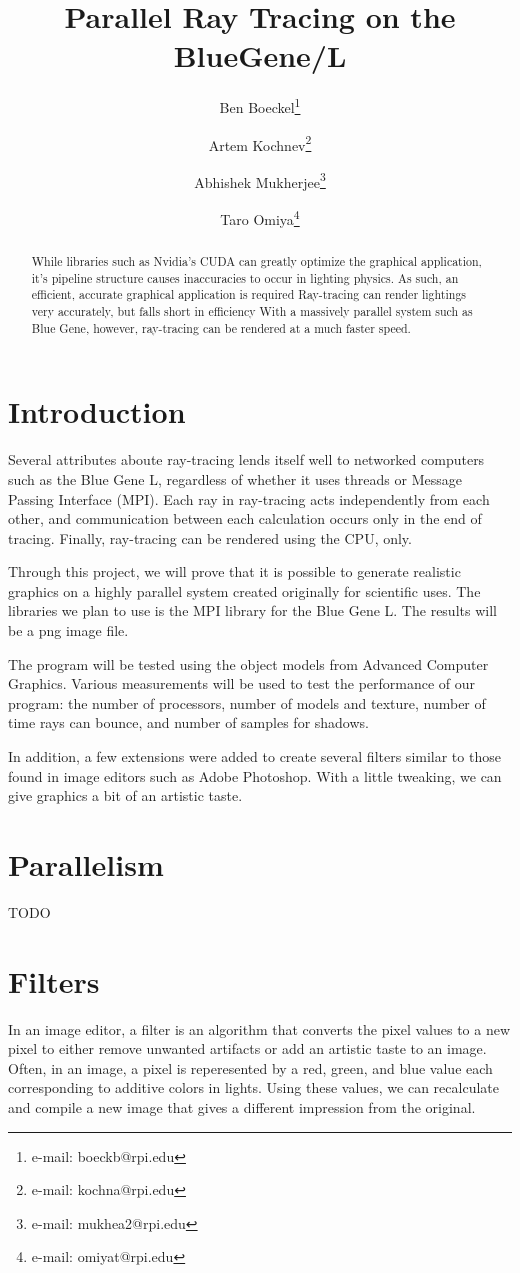 \documentclass{acmsiggraph}
\title{Parallel Ray Tracing on the BlueGene/L}
\author{%
Ben Boeckel\thanks{e-mail: boeckb@rpi.edu} %
\and Artem Kochnev\thanks{e-mail: kochna@rpi.edu} %
\and Abhishek Mukherjee\thanks{e-mail: mukhea2@rpi.edu} %
\and Taro Omiya\thanks{e-mail: omiyat@rpi.edu}}
\begin{document}
\maketitle

\begin{abstract}
While libraries such as Nvidia's CUDA can greatly optimize the graphical
application, it's pipeline structure causes inaccuracies to occur in lighting
physics.  As such, an efficient, accurate graphical application is required
Ray-tracing can render lightings very accurately, but falls short in efficiency
With a massively parallel system such as Blue Gene, however, ray-tracing can be
rendered at a much faster speed.
\end{abstract}
\keywordlist

\section{Introduction}
Several attributes aboute ray-tracing lends itself well to networked computers
such as the Blue Gene L, regardless of whether it uses threads or Message
Passing Interface (MPI).  Each ray in ray-tracing acts independently from each
other, and communication between each calculation occurs only in the end of
tracing.  Finally, ray-tracing can be rendered using the CPU, only.

Through this project, we will prove that it is possible to generate realistic
graphics on a highly parallel system created originally for scientific uses.
The libraries we plan to use is the MPI library for the Blue Gene L.
The results will be a png image file.

The program will be tested using the object models from Advanced Computer
Graphics.  Various measurements will be used to test the performance of our
program: the number of processors, number of models and texture, number of time
rays can bounce, and number of samples for shadows.

In addition, a few extensions were added to create several filters similar to
those found in image editors such as Adobe Photoshop. With a little tweaking, we
can give graphics a bit of an artistic taste.

\section{Parallelism}
TODO

\section{Filters}
In an image editor, a filter is an algorithm that converts the pixel values to
a new pixel to either remove unwanted artifacts or add an artistic taste to an
image.  Often, in an image, a pixel is reperesented by a red, green, and blue
value each corresponding to additive colors in lights.  Using these values,
we can recalculate and compile a new image that gives a different impression
from the original.
\end{document}
